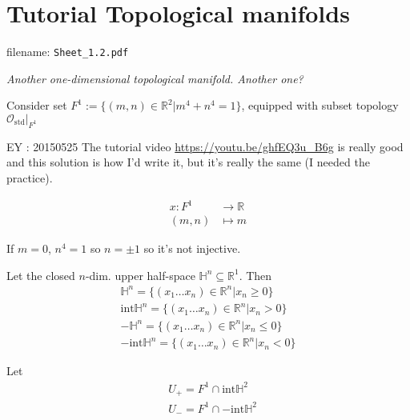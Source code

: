 \section*{Tutorial Topological manifolds}

filename: \verb|Sheet_1.2.pdf|



\emph{Another one-dimensional topological manifold. Another one?}

Consider set $F^1:= \lbrace (m,n)\in \mathbb{R}^2 | m^4 + n^4=1 \rbrace$, equipped with subset topology $\left. \mathcal{O}_{\text{std}} \right|_{F^1}$


\solutionhead{} EY : 20150525 The tutorial video \url{https://youtu.be/ghfEQ3u_B6g} is really good and this solution is how I'd write it, but it's really the same (I needed the practice).

\[
\boxed{ \begin{aligned}
   x : F^1 & \to \mathbb{R} \\ 
  (m,n) & \mapsto m
\end{aligned} }
\]

If $m=0$, $n^4=1$ so $n=\pm 1$ so it's not injective.  

Let the closed $n$-dim. upper half-space $\mathbb{H}^n \subseteq \mathbb{R}^1$.  Then
\[
\begin{aligned}
  \mathbb{H}^n = \lbrace (x_1 \dots x_n) \in \mathbb{R}^n | x_n \geq 0 \rbrace \\ 
  \text{int}\mathbb{H}^n = \lbrace (x_1 \dots x_n) \in \mathbb{R}^n | x_n > 0 \rbrace \\
  - \mathbb{H}^n = \lbrace (x_1 \dots x_n) \in \mathbb{R}^n | x_n \leq 0 \rbrace \\ 
  -\text{int}\mathbb{H}^n = \lbrace (x_1 \dots x_n) \in \mathbb{R}^n | x_n <0 \rbrace
\end{aligned}
\]


\solutionhead{}

Let 
\[
\begin{aligned}
  & U_+ = F^1 \cap \text{int}\mathbb{H}^2 \\
  & U_- = F^1 \cap -\text{int}\mathbb{H}^2
\end{aligned}
\]

